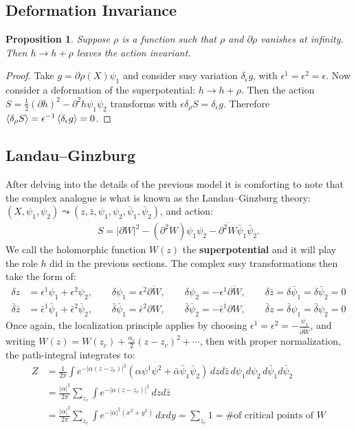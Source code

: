 \documentclass{report}
\theoremstyle{plain}
\newtheorem{proposition}[theorem]{Proposition}
\theoremstyle{definition}
\theoremstyle{remark}
\newcommand{\di}{\partial}
\newcommand{\FR}[2]{\frac{#1}{#2}}
\begin{document}
\subsection{Deformation Invariance}
\begin{proposition} Suppose $\rho$ is a function such that $\rho$ and
$\di\rho$ vanishes at infinity. Then $h\to h+\rho$ leaves the action
invariant.
\end{proposition}
\begin{proof}
Take $g = \di\rho(X)\psi_1$ and consider susy variation $\delta_\epsilon
g$, with $\epsilon^1=\epsilon^2=\epsilon$. Now consider a deformation of
the superpotential: $h\to h+\rho$. Then the action $S = \FR{1}{2}(\di h)^2
- \di^2h \psi_1\psi_2$ transforms with $\epsilon\delta_\rho S =
\delta_\epsilon g$. Therefore $\braket{\delta_\rho S} =\epsilon^{-1}
\braket{\delta_\epsilon g}=0$.
\end{proof}

\subsection{Landau--Ginzburg}
After delving into the details of the previous model it is comforting to
note that the complex analogue is what is known as the Landau--Ginzburg
theory: $(X,\psi_1,\psi_2) \leadsto (z,\bar z, \psi_1, \psi_2, \bar\psi_1,
\bar\psi_2)$, and action:
\begin{align}
S = |\di W|^2-(\di^2 W)\psi_1\psi_2 - \overline{\di^2W}\bar\psi_1\bar\psi_2.
\label{LandauGinzburgaction}
\end{align}
We call the holomorphic function $W(z)$ the \textbf{superpotential} and it
will play the role $h$ did in the previous sections. The complex susy
transformations then take the form of:
\begin{align}
\delta z &= \epsilon^1\psi_1+\epsilon^2\psi_2, \qquad
\delta\psi_1 = \epsilon^2\overline{\di W},\qquad
\delta\psi_2 =-\epsilon^1\overline{\di W},\qquad
\delta \bar z=\delta\bar\psi_1 = \delta\bar\psi_2=0\\
\bar\delta\bar z &= \bar\epsilon^1\bar\psi_1+\bar\epsilon^2\bar\psi_2, \qquad
\bar\delta\bar \psi_1 = \bar\epsilon^2\di W,\qquad
\bar\delta\bar \psi_2 =-\bar\epsilon^1\di W,\qquad
\bar\delta z=\bar\delta\psi_1 = \bar\delta\psi_2=0
\label{complexsusytransformations}
\end{align}
Once again, the localization principle applies by choosing
$\epsilon^1=\epsilon^2=-\FR{\psi_1}{\overline{\di W}}$, and writing $W(z) =
W(z_c)+\FR{\alpha_c}{2}(z-z_c)^2+\cdots$, then with proper normalization,
the path-integral integrates to:
\begin{align*}
    Z &= \FR{1}{2\pi}\int
    e^{-|\alpha(z-z_c)|^2}(\alpha\psi^1\psi^2+\bar\alpha\bar\psi_1\bar\psi_2)\,
    dzd\bar z\,d\psi_1d\psi_2\,d\bar\psi_1d\bar\psi_2\\
&= \FR{|\alpha|^2}{2\pi} \sum_{z_c} \int e^{-|\alpha(z-z_c)|^2}\,dzd\bar z\\
&= \FR{|\alpha|^2}{2\pi} \sum_{z_c} \int e^{-|\alpha|^2(x^2+y^2)} \,dxdy
= \sum_{z_c} 1 = \text{\# of critical points of $W$}
\end{align*}
\end{document}
